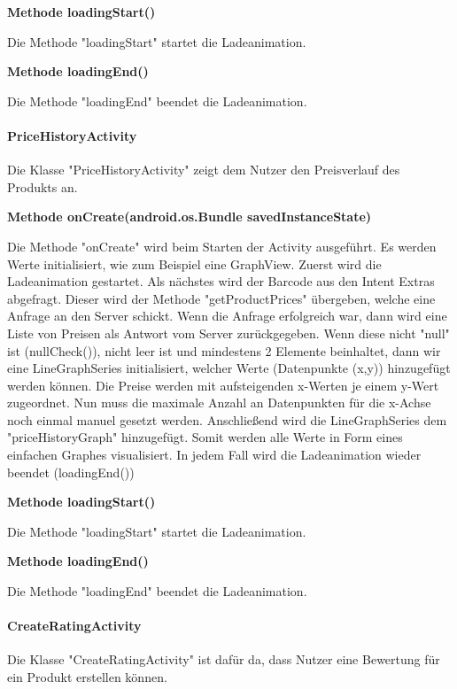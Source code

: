 \documentclass{scrartcl}
\begin{document}
\noindent\textbf{Methode loadingStart()}

\noindent Die Methode "loadingStart" startet die Ladeanimation. \newline

\noindent\textbf{Methode loadingEnd()}

\noindent Die Methode "loadingEnd" beendet die Ladeanimation. \newline

\paragraph{PriceHistoryActivity}
Die Klasse "PriceHistoryActivity" zeigt dem Nutzer den Preisverlauf des Produkts an. \newline 

\noindent\textbf{Methode onCreate(android.os.Bundle savedInstanceState)}

\noindent Die Methode "onCreate" wird beim Starten der Activity ausgeführt. Es werden Werte initialisiert, wie zum Beispiel eine GraphView. Zuerst wird die Ladeanimation gestartet. Als nächstes wird der Barcode aus den Intent Extras abgefragt. Dieser wird der Methode "getProductPrices" übergeben, welche eine Anfrage an den Server schickt. Wenn die Anfrage erfolgreich war, dann wird eine Liste von Preisen als Antwort vom Server zurückgegeben. Wenn diese nicht "null" ist (nullCheck()), nicht leer ist und mindestens 2 Elemente beinhaltet, dann wir eine LineGraphSeries initialisiert, welcher Werte (Datenpunkte (x,y)) hinzugefügt werden können. Die Preise werden mit aufsteigenden x-Werten je einem y-Wert zugeordnet. Nun muss die maximale Anzahl an Datenpunkten für die x-Achse noch einmal manuel gesetzt werden. Anschließend wird die LineGraphSeries dem "priceHistoryGraph" hinzugefügt. Somit werden alle Werte in Form eines einfachen Graphes visualisiert. In jedem Fall wird die Ladeanimation wieder beendet (loadingEnd()) \newline

\noindent\textbf{Methode loadingStart()}

\noindent Die Methode "loadingStart" startet die Ladeanimation. \newline

\noindent\textbf{Methode loadingEnd()}

\noindent Die Methode "loadingEnd" beendet die Ladeanimation. \newline

\paragraph{CreateRatingActivity}
Die Klasse "CreateRatingActivity" ist dafür da, dass Nutzer eine Bewertung für ein Produkt erstellen können. \newline 
\end{document}
